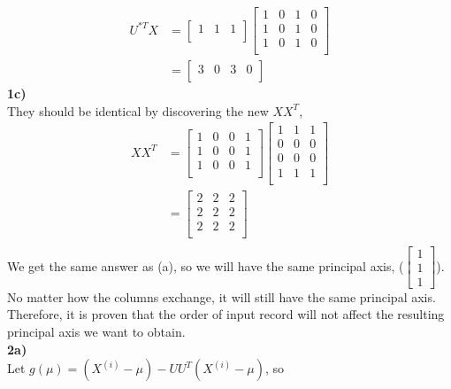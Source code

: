 \documentclass[12pt]{article}
\begin{document}
\begin{align*}
U^{*T}X &= \begin{bmatrix}
1 & 1 & 1\\
\end{bmatrix}
\begin{bmatrix}
1 & 0 & 1 & 0\\
1 & 0 & 1 & 0\\
1 & 0 & 1 & 0\\
\end{bmatrix}\\
&= \begin{bmatrix}
3 & 0 & 3 & 0\\
\end{bmatrix}
\end{align*}\newpage
\textbf{1c)}\\
They should be identical by discovering the new $XX^{T}$,\\
\begin{align*}
XX^{T} &=
\begin{bmatrix}
1 & 0 & 0 & 1\\
1 & 0 & 0 & 1\\
1 & 0 & 0 & 1\\
\end{bmatrix}
\begin{bmatrix}
1 & 1 & 1\\
0 & 0 & 0\\
0 & 0 & 0\\
1 & 1 & 1\\
\end{bmatrix}\\
&= \begin{bmatrix}
2 & 2 & 2\\
2 & 2 & 2\\
2 & 2 & 2\\
\end{bmatrix}\\
\end{align*}
We get the same answer as (a), so we will have the same principal axis, ($\begin{bmatrix}
1\\1\\1
\end{bmatrix}$). 
No matter how the columns exchange, it will still have the same principal axis. Therefore, it is proven that the order of input record will not affect the resulting principal axis we want to obtain.\\[0.5in]
\textbf{2a)}\\
Let $g(\mu) = (X^{(i)} - \mu ) - UU^{T}(X^{(i)} - \mu )$, so\\
\end{document}
